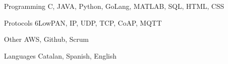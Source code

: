 


\begin{cvskills}


\cvskill
{Programming} %
{C, JAVA, Python, GoLang, MATLAB, SQL, HTML, CSS} %


\cvskill
{Protocols} %
{6LowPAN, IP, UDP, TCP, CoAP, MQTT} %



\cvskill
{Other} %
{AWS, Github, Scrum} %


\cvskill
{Languages} %
{Catalan, Spanish, English} %


\end{cvskills}
